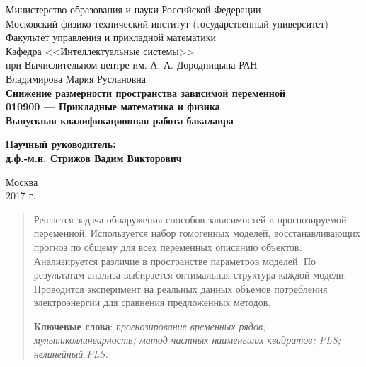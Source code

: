 \documentclass[12pt,fleqn,unicode]{article}
\begin{document}
{
\renewcommand{\baselinestretch}{1}
\thispagestyle{empty}
\begin{center}
    \sc
        Министерство образования и науки Российской Федерации\\
        Московский физико-технический институт
        {\rm(государственный университет)}\\
        Факультет управления и прикладной математики\\
        Кафедра <<Интеллектуальные системы>>\\
        при Вычислительном центре им. А. А. Дородницына РАН\\[35mm]
    \rm\large
        Владимирова Мария Руслановна\\[10mm]
    \bf\Large
    Снижение размерности пространства зависимой переменной\\[10mm]
    \rm\normalsize
        010900 — Прикладные математика и физика\\[10mm]
    \sc
        Выпускная квалификационная работа бакалавра\\[30mm]
\end{center}
\hfill\parbox{80mm}{
    \begin{flushleft}
    \bf
        Научный руководитель:\\
    \rm
        д.ф.-м.н. Стрижов Вадим Викторович\\[4.9cm]
    \end{flushleft}
}
\begin{center}
    Москва\\
    2017 г.
\end{center}
}

\newpage
\tableofcontents

\newpage
\begin{abstract}
  Решается задача обнаружения способов зависимостей в прогнозируемой переменной. Используется набор гомогенных моделей, восстанавливающих прогноз по общему для всех переменных описанию объектов. Анализируется различие в пространстве параметров моделей. По результатам анализа выбирается оптимальная структура каждой модели. Проводится эксперимент на реальных данных объемов потребления электроэнергии для сравнения предложенных методов.  

  \bigskip
    \textbf{Ключевые слова}: \emph{прогнозирование временных рядов; мультиколлинеарность; матод частных наименьших квадратов; PLS; нелинейный PLS.}
\end{abstract}
\end{document}
